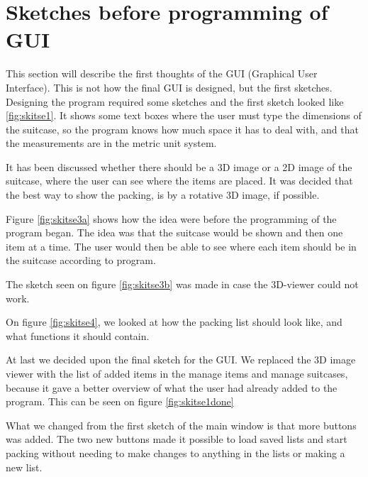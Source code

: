 \section{Sketches before programming of GUI}
\label{sec:sketches}
This section will describe the first thoughts of the GUI (Graphical User Interface). This is not how the final GUI is designed, but the first sketches.
Designing the program required some sketches and the first sketch looked like \ref{fig:skitse1}.
It shows some text boxes where the user must type the dimensions of the suitcase, so the program knows how much space it has to deal with, and that the measurements are in the metric unit system.


It has been discussed whether there should be a 3D image or a 2D image of the suitcase, where the user can see where the items are placed. It was decided that the best way to show the packing, is by a rotative 3D image, if possible.

Figure \ref{fig:skitse3a} shows how the idea were before the programming of the program began. The idea was that the suitcase would be shown and then one  item at a time. The user would then be able to see where each item should be in the suitcase according to program.


The sketch seen on figure \ref{fig:skitse3b} was made in case the 3D-viewer could not work.

On figure \ref{fig:skitse4}, we looked at how the packing list should look like, and what functions it should contain.


At last we decided upon the final sketch for the GUI. We replaced the 3D image viewer with the list of added items in the manage items and manage suitcases, because it gave a better overview of what the user had already added to the program. This can be seen on figure \ref{fig:skitse1done} 


What we changed from the first sketch of the main window is that more buttons was added. The two new buttons made it possible to load saved lists and start packing without needing to make changes to anything in the lists or making a new list.

